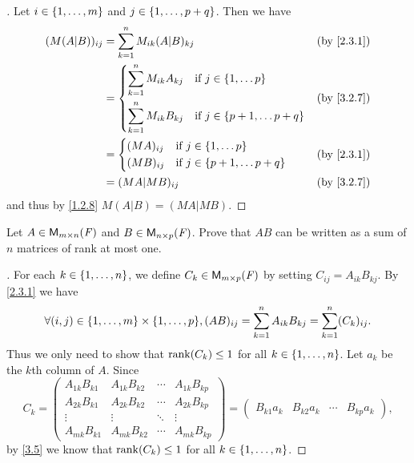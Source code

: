 \begin{proof}[]
	Let \(i \in \left\lbrace1, \dots, m\right\rbrace\) and \(j \in \left\lbrace1, \dots, p + q\right\rbrace\).
	Then we have
	\begin{align*}
		(M (A | B))_{i j} & = \sum_{k = 1}^n M_{i k} (A | B)_{k j}                                        &  & \by{2.3.1} \\
		                  & = \begin{dcases}
			                      \sum_{k = 1}^n M_{i k} A_{k j} & \text{if } j \in \set{1, \dots p}         \\
			                      \sum_{k = 1}^n M_{i k} B_{k j} & \text{if } j \in \set{p + 1, \dots p + q}
		                      \end{dcases} &  & \by{3.2.7}                  \\
		                  & = \begin{dcases}
			                      (MA)_{i j} & \text{if } j \in \set{1, \dots p}         \\
			                      (MB)_{i j} & \text{if } j \in \set{p + 1, \dots p + q}
		                      \end{dcases}                     &  & \by{2.3.1}                                      \\
		                  & = (MA | MB)_{i j}                                                             &  & \by{3.2.7}
	\end{align*}
	and thus by \cref{1.2.8} \(M (A | B) = (MA | MB)\).
\end{proof}

\setcounter{ex}{17}
\begin{ex}\label{ex:3.2.18}
	Let \(A \in \ms\) and \(B \in \ms[n][p][\F]\).
	Prove that \(AB\) can be written as a sum of \(n\) matrices of rank at most one.
\end{ex}

\begin{proof}[]
	For each \(k \in \left\lbrace1, \dots, n\right\rbrace\), we define \(C_k \in \ms[m][p][\F]\) by setting \(C_{i j} = A_{i k} B_{k j}\).
	By \cref{2.3.1} we have
	\[
		\forall (i, j) \in \set{1, \dots, m} \times \set{1, \dots, p}, (AB)_{i j} = \sum_{k = 1}^n A_{i k} B_{k j} = \sum_{k = 1}^n (C_k)_{i j}.
	\]
	Thus we only need to show that \(\rk{C_k} \leq 1\) for all \(k \in \left\lbrace1, \dots, n\right\rbrace\).
	Let \(a_k\) be the \(k\)th column of \(A\).
	Since
	\[
		C_k = \begin{pmatrix}
			A_{1 k} B_{k 1} & A_{1 k} B_{k 2} & \cdots & A_{1 k} B_{k p} \\
			A_{2 k} B_{k 1} & A_{2 k} B_{k 2} & \cdots & A_{2 k} B_{k p} \\
			\vdots          & \vdots          & \ddots & \vdots          \\
			A_{m k} B_{k 1} & A_{m k} B_{k 2} & \cdots & A_{m k} B_{k p}
		\end{pmatrix} = \begin{pmatrix}
			B_{k 1} a_k & B_{k 2} a_k & \cdots & B_{k p} a_k
		\end{pmatrix},
	\]
	by \cref{3.5} we know that \(\rk{C_k} \leq 1\) for all \(k \in \left\lbrace1, \dots, n\right\rbrace\).
\end{proof}

